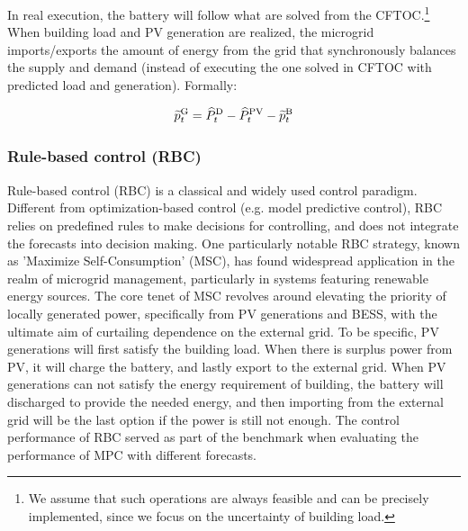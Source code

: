 In real execution, the battery will follow what are solved from the CFTOC.\footnote{We assume that such operations are always feasible and can be precisely implemented, since we focus on the uncertainty of building load.} When building load and PV generation are realized, the microgrid imports/exports the amount of energy from the grid that synchronously balances the supply and demand (instead of executing the one solved in CFTOC with predicted load and generation). Formally:

\begin{equation}
    \widetilde{p}^{\text{G}}_t  = \widehat{P}^\text{D}_t - \widehat{P}^\text{PV}_t - \widetilde{p}^{\text{B}}_t 
\end{equation}

\subsubsection{Rule-based control (RBC)} %
\label{sec:RBC}
Rule-based control (RBC) is a classical and widely used control paradigm. Different from optimization-based control (e.g. model predictive control), RBC relies on predefined rules to make decisions for controlling, and does not integrate the forecasts into decision making. 
One particularly notable RBC strategy, known as 'Maximize Self-Consumption' (MSC), has found widespread application in the realm of microgrid management, particularly in systems featuring renewable energy sources. The core tenet of MSC revolves around elevating the priority of locally generated power, specifically from PV generations and BESS, with the ultimate aim of curtailing dependence on the external grid.
To be specific, PV generations will first satisfy the building load. When there is surplus power from PV, it will charge the battery, and lastly export to the external grid. When PV generations can not satisfy the energy requirement of building, the battery will discharged to provide the needed energy, and then importing from the external grid will be the last option if the power is still not enough. 
The control performance of RBC served as part of the benchmark when evaluating the performance of MPC with different forecasts.

